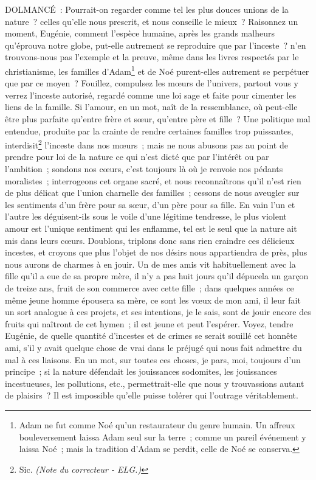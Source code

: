 \documentclass[french,twoside]{book} %
\begin{document}
DOLMANCÉ : Pourrait-on regarder comme tel les plus douces unions de la nature ? celles qu’elle nous prescrit, et nous conseille le mieux ? Raisonnez un moment, Eugénie, comment l’espèce humaine, après les grands malheurs qu’éprouva notre globe, put-elle autrement se reproduire que par l’inceste ? n’en trouvons-nous pas l’exemple et la preuve, même dans les livres respectés par le christianisme, les familles d’Adam\footnote{ Adam ne fut comme Noé qu’un restaurateur du genre humain. Un affreux bouleversement laissa Adam seul sur la terre ; comme un pareil événement y laissa Noé ; mais la tradition d’Adam se perdit, celle de Noé se conserva.} et de Noé purent-elles autrement se perpétuer que par ce moyen ? Fouillez, compulsez les mœurs de l’univers, partout vous y verrez l’inceste autorisé, regardé comme une loi sage et faite pour cimenter les liens de la famille. Si l’amour, en un mot, naît de la ressemblance, où peut-elle être plus parfaite qu’entre frère et sœur, qu’entre père et fille ? Une politique mal entendue, produite par la crainte de rendre certaines familles trop puissantes, interdisit\footnote{ Sic. {\itshape (Note du correcteur - ELG.)}} l’inceste dans nos mœurs ; mais ne nous abusons pas au point de prendre pour loi de la nature ce qui n’est dicté que par l’intérêt ou par l’ambition ; sondons nos cœurs, c’est toujours là où je renvoie nos pédants moralistes ; interrogeons cet organe sacré, et nous reconnaîtrons qu’il n’est rien de plus délicat que l’union charnelle des familles ; cessons de nous aveugler sur les sentiments d’un frère pour sa sœur, d’un père pour sa fille. En vain l’un et l’autre les déguisent-ils sous le voile d’une légitime tendresse, le plus violent amour est l’unique sentiment qui les enflamme, tel est le seul que la nature ait mis dans leurs cœurs. Doublons, triplons donc sans rien craindre ces délicieux incestes, et croyons que plus l’objet de nos désirs nous appartiendra de près, plus nous aurons de charmes à en jouir. Un de mes amis vit habituellement avec la fille qu’il a eue de sa propre mère, il n’y a pas huit jours qu’il dépucela un garçon de treize ans, fruit de son commerce avec cette fille ; dans quelques années ce même jeune homme épousera sa mère, ce sont les vœux de mon ami, il leur fait un sort analogue à ces projets, et ses intentions, je le sais, sont de jouir encore des fruits qui naîtront de cet hymen ; il est jeune et peut l’espérer. Voyez, tendre Eugénie, de quelle quantité d’incestes et de crimes se serait souillé cet honnête ami, s’il y avait quelque chose de vrai dans le préjugé qui nous fait admettre du mal à ces liaisons. En un mot, sur toutes ces choses, je pars, moi, toujours d’un principe ; si la nature défendait les jouissances sodomites, les jouissances incestueuses, les pollutions, etc., permettrait-elle que nous y trouvassions autant de plaisirs ? Il est impossible qu’elle puisse tolérer qui l’outrage véritablement.\par
\end{document}
